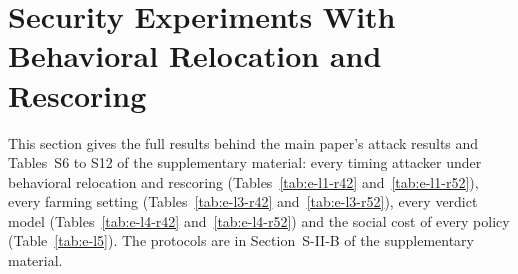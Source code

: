\documentclass[10pt,onecolumn,letterpaper]{article}
\begin{document}
\begin{table}[!t]
\caption{Robustness on r6.2 (Functional Units, $\delta$ = 0.002)\label{tab:s-robust}}
\centering
{}
\end{table}

\section{Security Experiments With Behavioral Relocation and Rescoring}
\label{sec:e-rev8}
This section gives the full results behind the main paper's attack results and Tables~S6 to S12 of the supplementary material: every timing attacker under behavioral relocation and rescoring (Tables~\ref{tab:e-l1-r42} and~\ref{tab:e-l1-r52}), every farming setting (Tables~\ref{tab:e-l3-r42} and~\ref{tab:e-l3-r52}), every verdict model (Tables~\ref{tab:e-l4-r42} and~\ref{tab:e-l4-r52}) and the social cost of every policy (Table~\ref{tab:e-l5}). The protocols are in Section~S-II-B of the supplementary material.
\end{document}
